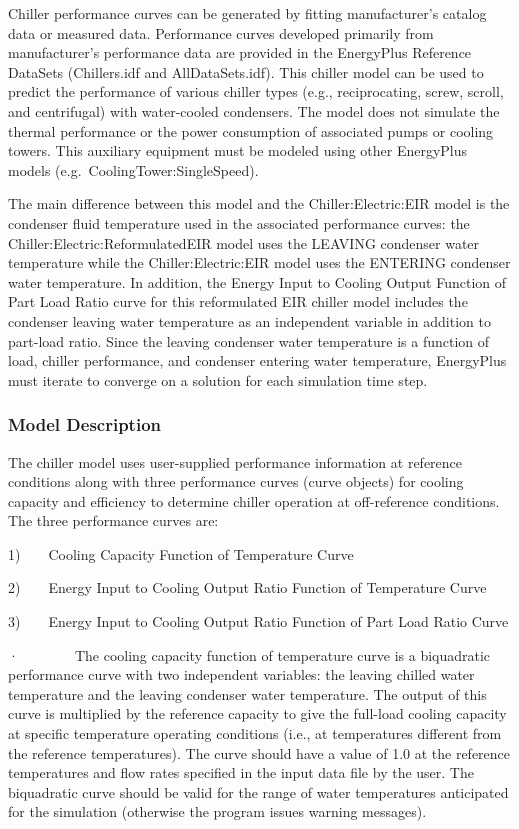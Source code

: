Chiller performance curves can be generated by fitting manufacturer's catalog data or measured data. Performance curves developed primarily from manufacturer's performance data are provided in the EnergyPlus Reference DataSets (Chillers.idf and AllDataSets.idf). This chiller model can be used to predict the performance of various chiller types (e.g., reciprocating, screw, scroll, and centrifugal) with water-cooled condensers. The model does not simulate the thermal performance or the power consumption of associated pumps or cooling towers. This auxiliary equipment must be modeled using other EnergyPlus models (e.g.~CoolingTower:SingleSpeed).

The main difference between this model and the Chiller:Electric:EIR model is the condenser fluid temperature used in the associated performance curves: the Chiller:Electric:ReformulatedEIR model uses the LEAVING condenser water temperature while the Chiller:Electric:EIR model uses the ENTERING condenser water temperature. In addition, the Energy Input to Cooling Output Function of Part Load Ratio curve for this reformulated EIR chiller model includes the condenser leaving water temperature as an independent variable in addition to part-load ratio. Since the leaving condenser water temperature is a function of load, chiller performance, and condenser entering water temperature, EnergyPlus must iterate to converge on a solution for each simulation time step.

\subsubsection{Model Description}\label{model-description-3-002}

The chiller model uses user-supplied performance information at reference conditions along with three performance curves (curve objects) for cooling capacity and efficiency to determine chiller operation at off-reference conditions. The three performance curves are:

1)~~~~Cooling Capacity Function of Temperature Curve

2)~~~~Energy Input to Cooling Output Ratio Function of Temperature Curve

3)~~~~Energy Input to Cooling Output Ratio Function of Part Load Ratio Curve

·~~~~~~~~The cooling capacity function of temperature curve is a biquadratic performance curve with two independent variables: the leaving chilled water temperature and the leaving condenser water temperature. The output of this curve is multiplied by the reference capacity to give the full-load cooling capacity at specific temperature operating conditions (i.e., at temperatures different from the reference temperatures). The curve should have a value of 1.0 at the reference temperatures and flow rates specified in the input data file by the user. The biquadratic curve should be valid for the range of water temperatures anticipated for the simulation (otherwise the program issues warning messages).

